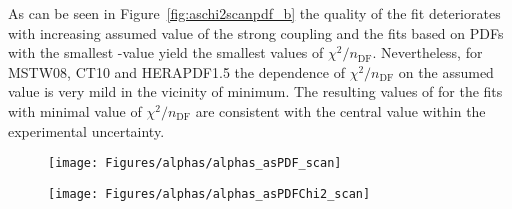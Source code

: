 As can be seen in Figure~\ref{fig:aschi2scanpdf_b} the quality of the fit deteriorates with increasing assumed value of the strong coupling and the fits based on PDFs with the smallest \asz-value yield the smallest values of $\chi^2/n_\text{DF}$. Nevertheless, for MSTW08, CT10 and HERAPDF1.5 the dependence of $\chi^2/n_\text{DF}$ on the assumed value is very mild in the vicinity of minimum. The resulting values of \as for the fits with minimal value of $\chi^2/n_\text{DF}$ are consistent with the central value within the experimental uncertainty.

\begin{figure}[t]
 \centering
\begin{subfloat}[]{\texttt{[image: Figures/alphas/alphas\_asPDF\_scan]}
   \label{fig:aschi2scanpdf_a}
 }%
\end{subfloat}
\begin{subfloat}[]{\texttt{[image: Figures/alphas/alphas\_asPDFChi2\_scan]}
   \label{fig:aschi2scanpdf_b}
 }%
\end{subfloat}
 \caption{}
 \label{fig:aschi2scanpdf}
\end{figure}
